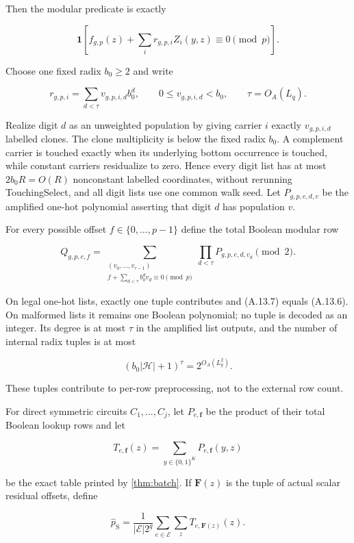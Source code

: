 \documentclass[11pt,letterpaper]{article}
\newcommand{\cref}[1]{\ref{#1}}
\theoremstyle{definition}
\theoremstyle{remark}
\begin{document}
Then the modular predicate is exactly

\[
\mathbf1\left[
f_{g,p}(z)
{}+{}
\sum_i r_{g,p,i}Z_i(y,z)
\equiv0\pmod p
\right].
\tag{A.13.6}
\]

Choose one fixed radix \(b_0\ge2\) and write

\[
r_{g,p,i}
{}={}
\sum_{d<\tau}
v_{g,p,i,d}b_0^d,
\qquad
0\le v_{g,p,i,d}<b_0,
\qquad
\tau=O_A(L_q).
\]

Realize digit \(d\) as an unweighted population by giving carrier \(i\)
exactly \(v_{g,p,i,d}\) labelled clones. The clone multiplicity is below
the fixed radix \(b_0\). A complement carrier is touched exactly when
its underlying bottom occurrence is touched, while constant carriers
residualize to zero. Hence every digit list has at most \(2b_0R=O(R)\)
nonconstant labelled coordinates, without rerunning TouchingSelect, and
all digit lists use one common walk seed. Let \(P_{g,p,e,d,v}\) be the
amplified one-hot polynomial asserting that digit \(d\) has population
\(v\).

For every possible offset \(f\in\{0,\ldots,p-1\}\) define the total
Boolean modular row

\[
Q_{g,p,e,f}
{}={}
\sum_{\substack{
(v_0,\ldots,v_{\tau-1})\\
f+\sum_{d<\tau}b_0^dv_d\equiv0\pmod p}}
\prod_{d<\tau}
P_{g,p,e,d,v_d}
\pmod2.
\tag{A.13.7}
\]

On legal one-hot lists, exactly one tuple contributes and (A.13.7)
equals (A.13.6). On malformed lists it remains one Boolean polynomial;
no tuple is decoded as an integer. Its degree is at most \(\tau\) in the
amplified list outputs, and the number of internal radix tuples is at
most

\[
(b_0|\mathcal H|+1)^\tau
{}={}
2^{O_A(L_q^2)}.
\tag{A.13.8}
\]

These tuples contribute to per-row preprocessing, not to the external
row count.

For direct symmetric circuits \(C_1,\ldots,C_j\), let
\(P_{e,\mathbf f}\) be the product of their total Boolean lookup rows
and let

\[
T_{e,\mathbf f}(z)
{}={}
\sum_{y\in\{0,1\}^K}
P_{e,\mathbf f}(y,z)
\]

be the exact table printed by \cref{thm:batch}. If \(\mathbf F(z)\) is the
tuple of actual scalar residual offsets, define

\[
\widehat p_{\mathrm S}
{}={}
\frac1{|\mathcal E|2^q}
\sum_{e\in\mathcal E}
\sum_z
T_{e,\mathbf F(z)}(z).
\tag{A.13.9}
\]
\end{document}
